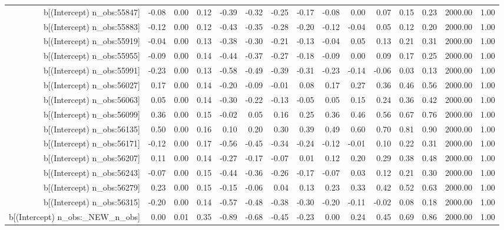 \begin{table}[ht]
\begin{tabular}{rrrrrrrrrrrrrrr}
  b[(Intercept) n\_obs:55847] & -0.08 & 0.00 & 0.12 & -0.39 & -0.32 & -0.25 & -0.17 & -0.08 & 0.00 & 0.07 & 0.15 & 0.23 & 2000.00 & 1.00 \\ 
  b[(Intercept) n\_obs:55883] & -0.12 & 0.00 & 0.12 & -0.43 & -0.35 & -0.28 & -0.20 & -0.12 & -0.04 & 0.05 & 0.12 & 0.20 & 2000.00 & 1.00 \\ 
  b[(Intercept) n\_obs:55919] & -0.04 & 0.00 & 0.13 & -0.38 & -0.30 & -0.21 & -0.13 & -0.04 & 0.05 & 0.13 & 0.21 & 0.31 & 2000.00 & 1.00 \\ 
  b[(Intercept) n\_obs:55955] & -0.09 & 0.00 & 0.14 & -0.44 & -0.37 & -0.27 & -0.18 & -0.09 & 0.00 & 0.09 & 0.17 & 0.25 & 2000.00 & 1.00 \\ 
  b[(Intercept) n\_obs:55991] & -0.23 & 0.00 & 0.13 & -0.58 & -0.49 & -0.39 & -0.31 & -0.23 & -0.14 & -0.06 & 0.03 & 0.13 & 2000.00 & 1.00 \\ 
  b[(Intercept) n\_obs:56027] & 0.17 & 0.00 & 0.14 & -0.20 & -0.09 & -0.01 & 0.08 & 0.17 & 0.27 & 0.36 & 0.46 & 0.56 & 2000.00 & 1.00 \\ 
  b[(Intercept) n\_obs:56063] & 0.05 & 0.00 & 0.14 & -0.30 & -0.22 & -0.13 & -0.05 & 0.05 & 0.15 & 0.24 & 0.36 & 0.42 & 2000.00 & 1.00 \\ 
  b[(Intercept) n\_obs:56099] & 0.36 & 0.00 & 0.15 & -0.02 & 0.05 & 0.16 & 0.25 & 0.36 & 0.46 & 0.56 & 0.67 & 0.76 & 2000.00 & 1.00 \\ 
  b[(Intercept) n\_obs:56135] & 0.50 & 0.00 & 0.16 & 0.10 & 0.20 & 0.30 & 0.39 & 0.49 & 0.60 & 0.70 & 0.81 & 0.90 & 2000.00 & 1.00 \\ 
  b[(Intercept) n\_obs:56171] & -0.12 & 0.00 & 0.17 & -0.56 & -0.45 & -0.34 & -0.24 & -0.12 & -0.01 & 0.10 & 0.22 & 0.31 & 2000.00 & 1.00 \\ 
  b[(Intercept) n\_obs:56207] & 0.11 & 0.00 & 0.14 & -0.27 & -0.17 & -0.07 & 0.01 & 0.12 & 0.20 & 0.29 & 0.38 & 0.48 & 2000.00 & 1.00 \\ 
  b[(Intercept) n\_obs:56243] & -0.07 & 0.00 & 0.15 & -0.44 & -0.36 & -0.26 & -0.17 & -0.07 & 0.03 & 0.12 & 0.21 & 0.30 & 2000.00 & 1.00 \\ 
  b[(Intercept) n\_obs:56279] & 0.23 & 0.00 & 0.15 & -0.15 & -0.06 & 0.04 & 0.13 & 0.23 & 0.33 & 0.42 & 0.52 & 0.63 & 2000.00 & 1.00 \\ 
  b[(Intercept) n\_obs:56315] & -0.20 & 0.00 & 0.14 & -0.57 & -0.48 & -0.38 & -0.30 & -0.20 & -0.11 & -0.02 & 0.08 & 0.18 & 2000.00 & 1.00 \\ 
  b[(Intercept) n\_obs:\_NEW\_n\_obs] & 0.00 & 0.01 & 0.35 & -0.89 & -0.68 & -0.45 & -0.23 & 0.00 & 0.24 & 0.45 & 0.69 & 0.86 & 2000.00 & 1.00 \\ 

\end{tabular}
\end{table}
